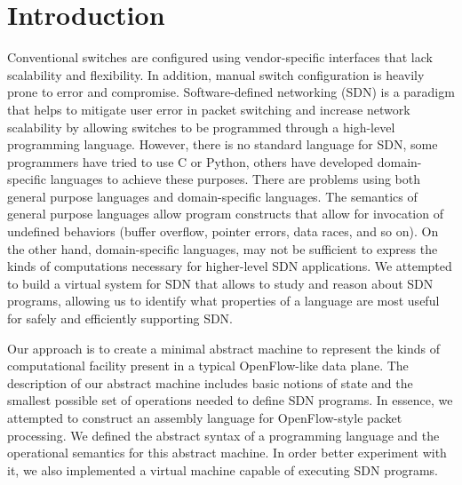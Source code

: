 
\section{Introduction}


Conventional switches are configured using vendor-specific interfaces that lack scalability and flexibility. In addition, manual switch configuration is heavily prone to error and compromise. Software-defined networking (SDN) is a paradigm that helps to mitigate user error in packet switching and increase network scalability by allowing switches to be programmed through a high-level programming language. However, there is no standard language for SDN, some programmers have tried to use C or Python, others have developed domain-specific languages to achieve these purposes. There are problems using both general purpose languages and domain-specific languages. The semantics of general purpose languages allow program constructs that allow for invocation of undefined behaviors (buffer overflow, pointer errors, data races, and so on). On the other hand, domain-specific languages, may not be sufficient to express the kinds of computations necessary for higher-level SDN applications. We attempted to build a virtual system for SDN that allows to study and reason about SDN programs, allowing us to identify what properties of a language are most useful for safely and efficiently supporting SDN.


Our approach is to create a minimal abstract machine to represent the kinds of computational facility present in a typical OpenFlow-like data plane.
The description of our abstract machine includes basic notions of state and the smallest possible set of operations needed to define SDN programs.
In essence, we attempted to construct an assembly language for OpenFlow-style packet processing. We defined the abstract syntax of a programming language and the operational semantics for this abstract machine. In order better experiment with it, we also implemented a virtual machine capable of executing SDN programs.

